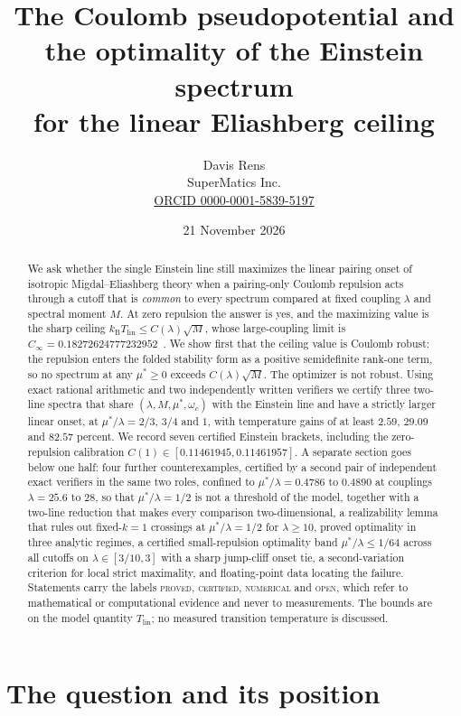 \documentclass[11pt]{article}
\title{The Coulomb pseudopotential and the optimality of the Einstein spectrum\\ for the linear Eliashberg ceiling}
\author{Davis Rens\\SuperMatics Inc.\\\href{https://orcid.org/0000-0001-5839-5197}{ORCID 0000-0001-5839-5197}}
\date{21 November 2026}
\newcommand{\kb}{k_{\mathrm B}}
\newcommand{\Tlin}{T_{\mathrm{lin}}}
\newcommand{\muS}{\mu^{*}}
\theoremstyle{definition}
\theoremstyle{remark}
\begin{document}
\maketitle

\begin{abstract}
We ask whether the single Einstein line still maximizes the linear pairing onset of
isotropic Migdal--Eliashberg theory when a pairing-only Coulomb repulsion acts through a
cutoff that is \emph{common} to every spectrum compared at fixed coupling $\lambda$ and
spectral moment $M$. At zero repulsion the answer is yes, and the maximizing value is the
sharp ceiling $\kb\Tlin\le C(\lambda)\sqrt M$, whose large-coupling limit is
$C_\infty=0.18272624777232952$~\cite{univglue,anisosharp}. We show first that the ceiling value is Coulomb robust:
the repulsion enters the folded stability form as a positive semidefinite rank-one term,
so no spectrum at any $\muS\ge0$ exceeds $C(\lambda)\sqrt M$. The optimizer is not robust.
Using exact rational arithmetic and two independently written verifiers we certify three
two-line spectra that share $(\lambda,M,\muS,\omega_c)$ with the Einstein line and have a
strictly larger linear onset, at $\muS/\lambda=2/3$, $3/4$ and $1$, with temperature
gains of at least $2.59$, $29.09$ and $82.57$ percent. We record seven certified Einstein
brackets, including the zero-repulsion calibration
$C(1)\in[0.11461945,0.11461957]$. A separate section goes below one half: four further
counterexamples, certified by a second pair of independent exact verifiers in the same two
roles, confined to $\muS/\lambda=0.4786$ to $0.4890$ at couplings $\lambda=25.6$ to $28$,
so that $\muS/\lambda=1/2$ is not a threshold of the model, together with a two-line
reduction that makes every comparison two-dimensional, a realizability lemma that rules out
fixed-$k=1$ crossings at $\muS/\lambda=1/2$ for $\lambda\ge10$, proved optimality in three
analytic regimes, a certified small-repulsion optimality band $\muS/\lambda\le1/64$ across
all cutoffs on $\lambda\in[3/10,3]$ with a sharp jump-cliff onset tie, a second-variation
criterion for local strict maximality, and floating-point data locating the failure.
Statements carry the
labels
\textsc{proved}, \textsc{certified}, \textsc{numerical} and \textsc{open}, which refer to
mathematical or computational evidence and never to measurements. The bounds are on the
model quantity $\Tlin$; no measured transition temperature is discussed.
\end{abstract}

\section{The question and its position}
\end{document}
